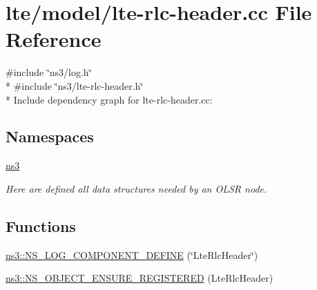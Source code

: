 \hypertarget{lte-rlc-header_8cc}{}\section{lte/model/lte-\/rlc-\/header.cc File Reference}
\label{lte-rlc-header_8cc}
{\ttfamily \#include \char`\"{}ns3/log.\+h\char`\"{}}\\*
{\ttfamily \#include \char`\"{}ns3/lte-\/rlc-\/header.\+h\char`\"{}}\\*
Include dependency graph for lte-\/rlc-\/header.cc\+:
\subsection*{Namespaces}
\begin{DoxyCompactItemize}
\item 
 \hyperlink{namespacens3}{ns3}
\begin{DoxyCompactList}\small\item\em Here are defined all data structures needed by an O\+L\+SR node. \end{DoxyCompactList}\end{DoxyCompactItemize}
\subsection*{Functions}
\begin{DoxyCompactItemize}
\item 
\hyperlink{namespacens3_a8d25373cc432e6d00508b0abab7a4de2}{ns3\+::\+N\+S\+\_\+\+L\+O\+G\+\_\+\+C\+O\+M\+P\+O\+N\+E\+N\+T\+\_\+\+D\+E\+F\+I\+NE} (\char`\"{}Lte\+Rlc\+Header\char`\"{})
\item 
\hyperlink{namespacens3_a1a6fb90cfd8f797a4f167599c95465d3}{ns3\+::\+N\+S\+\_\+\+O\+B\+J\+E\+C\+T\+\_\+\+E\+N\+S\+U\+R\+E\+\_\+\+R\+E\+G\+I\+S\+T\+E\+R\+ED} (Lte\+Rlc\+Header)
\end{DoxyCompactItemize}
